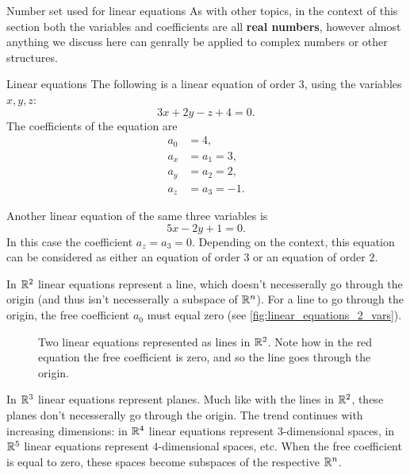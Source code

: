 \begin{note}{Number set used for linear equations}{}
	As with other topics, in the context of this section both the variables and coefficients are all \textbf{real numbers}, however almost anything we discuss here can genrally be applied to complex numbers or other structures.
\end{note}

\begin{example}{Linear equations}{}
	The following is a linear equation of order $3$, using the variables $x,y,z$:
	\[
		3x+2y-z+4 = 0.
	\]
	The coefficients of the equation are
	\begin{align*}
		a_{0}&=4,\\
		a_{x}&=a_{1}=3,\\
		a_{y}&=a_{2}=2,\\
		a_{z}&=a_{3}=-1.
	\end{align*}

	Another linear equation of the same three variables is
	\[
		5x-2y+1 = 0.
	\]
	In this case the coefficient $a_{z}=a_{3}=0$. Depending on the context, this equation can be considered as either an equation of order $3$ or an equation of order $2$.
\end{example}

In $\Rs[2]$ linear equations represent a line, which doesn't necesserally go through the origin (and thus isn't necesserally a subspace of $\Rs[n]$). For a line to go through the origin, the free coefficient $a_{0}$ must equal zero (see \autoref{fig:linear_equations_2_vars}).

\begin{figure}
	\centering
	\caption{Two linear equations represented as lines in $\Rs[2]$. Note how in the red equation the free coefficient is zero, and so the line goes through the origin.}
	\label{fig:linear_equations_2_vars}
\end{figure}

In $\Rs[3]$ linear equations represent planes. Much like with the lines in $\Rs[2]$, these planes don't necesserally go through the origin. The trend continues with increasing dimensions: in $\Rs[4]$ linear equations represent $3$-dimensional spaces, in $\Rs[5]$ linear equations represent $4$-dimensional spaces, etc. When the free coefficient is equal to zero, these spaces become subspaces of the respective $\Rs[n]$.
		
